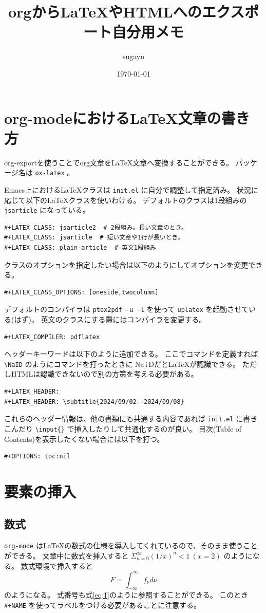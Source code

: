 \documentclass[a4paper, 10pt, notitlepage, uplatex, dvipdfmx]{jsarticle}
\author{sugayu}
\date{\today}
\title{\textbf{orgから\LaTeX{}やHTMLへのエクスポート自分用メモ}}
\newcommand{\NaID}{\mbox{Na\,{\sc i}\,D}}
\begin{document}
\maketitle
\section{org-modeにおける\LaTeX{}文章の書き方}
\label{sec:orgf2cabc3}
org-exportを使うことでorg文章を\LaTeX{}文章へ変換することができる。
パッケージ名は \texttt{ox-latex} 。

Emacs上における\LaTeX{}クラスは \texttt{init.el} に自分で調整して指定済み。
状況に応じて以下の\LaTeX{}クラスを使いわける。
デフォルトのクラスは1段組みの \texttt{jsarticle} になっている。
\begin{verbatim}
#+LATEX_CLASS: jsarticle2  # 2段組み。長い文章のとき。
#+LATEX_CLASS: jsarticle  # 短い文章や1行が長いとき。
#+LATEX_CLASS: plain-article  # 英文1段組み
\end{verbatim}
クラスのオプションを指定したい場合は以下のようにしてオプションを変更できる。
\begin{verbatim}
#+LATEX_CLASS_OPTIONS: [oneside,twocolumn]
\end{verbatim}
デフォルトのコンパイラは \texttt{ptex2pdf -u -l} を使って \texttt{uplatex} を起動させている(はず)。
英文のクラスにする際にはコンパイラを変更する。
\begin{verbatim}
#+LATEX_COMPILER: pdflatex
\end{verbatim}
ヘッダーキーワードは以下のように追加できる。
ここでコマンドを定義すれば \texttt{\textbackslash{}NaID} のようにコマンドを打ったときに \NaID だと\LaTeX{}が認識できる。
ただしHTMLは認識できないので別の方策を考える必要がある。
\begin{verbatim}
#+LATEX_HEADER: 
#+LATEX_HEADER: \subtitle{2024/09/02--2024/09/08}
\end{verbatim}
これらのヘッダー情報は、他の書類にも共通する内容であれば \texttt{init.el} に書きこんだり \texttt{\textbackslash{}input\{\}} で挿入したりして共通化するのが良い。
目次(Table of Contents)を表示したくない場合には以下を打つ。
\begin{verbatim}
#+OPTIONS: toc:nil
\end{verbatim}
\section{要素の挿入}
\label{sec:orge98ddde}
\subsection{数式}
\label{sec:org887cf9d}
\texttt{org-mode} は\LaTeX{}の数式の仕様を導入してくれているので、そのまま使うことができる。
文章中に数式を挿入すると \(\Sigma_{n = 0}^{\infty} (1/x)^n < 1\ (x = 2)\) のようになる。
数式環境で挿入すると
\begin{equation}
\label{eq:1}
F = \int_{-\infty}^{\infty} f_{\nu} d\nu
\end{equation}
のようになる。
式番号も式\ref{eq:1}のように参照することができる。
このとき \texttt{\#+NAME} を使ってラベルをつける必要があることに注意する。
\end{document}
